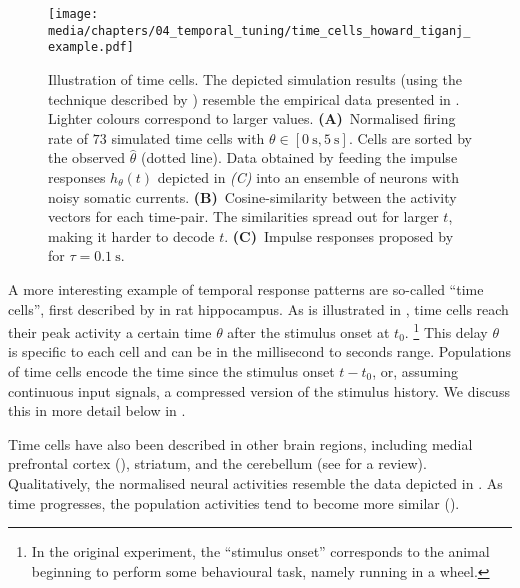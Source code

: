 \begin{figure}
	\centering
	\texttt{[image: media/chapters/04\_temporal\_tuning/time\_cells\_howard\_tiganj\_example.pdf]}%
	{\label{fig:time_cells_howard_tiganj_example_a}}%
	{\label{fig:time_cells_howard_tiganj_example_b}}%
	{\label{fig:time_cells_howard_tiganj_example_c}}%
	\caption[Illustration of time cells]{
		Illustration of time cells.
		The depicted simulation results (using the technique described by \cite{howard2014unified}) resemble the empirical data presented in \citet{tiganj2016sequential}.
		Lighter colours correspond to larger values.
		\textbf{(A)}~Normalised firing rate of $73$ simulated time cells with $\theta \in [\SI{0}{\second}, \SI{5}{\second}]$. Cells are sorted by the observed $\hat \theta$ (dotted line).
		Data obtained by feeding the impulse responses $h_\theta(t)$ depicted in \emph{(C)} into an ensemble of \LIF neurons with noisy somatic currents.
		\textbf{(B)}~Cosine-similarity between the activity vectors for each time-pair. The similarities spread out for larger $t$, making it harder to decode $t$.
		\textbf{(C)}~Impulse responses proposed by \citet{howard2014unified} for $\tau = \SI{0.1}{\second}$.
	}
	\label{fig:time_cells_howard_tiganj_example}
\end{figure}

A more interesting example of temporal response patterns are so-called \enquote{time cells}, first described by \citet{pastalkova2008internally} in rat hippocampus.
As is illustrated in , time cells reach their peak activity a certain time $\theta$ after the stimulus onset at $t_0$.%
\footnote{In the original \citet{pastalkova2008internally} experiment, the \enquote{stimulus onset} corresponds to the animal beginning to perform some behavioural task, namely running in a wheel.}
This delay $\theta$ is specific to each cell and can be in the millisecond to seconds range.
Populations of time cells encode the time since the stimulus onset $t - t_0$, or, assuming continuous input signals, a compressed version of the stimulus history.
We discuss this in more detail below in .

Time cells have also been described in other brain regions, including medial prefrontal cortex (\cite{tiganj2016sequential}), striatum, and the cerebellum (see \cite{lusk2016cerebellar} for a review).
Qualitatively, the normalised neural activities resemble the data depicted in .
As time progresses, the population activities tend to become more similar ().

